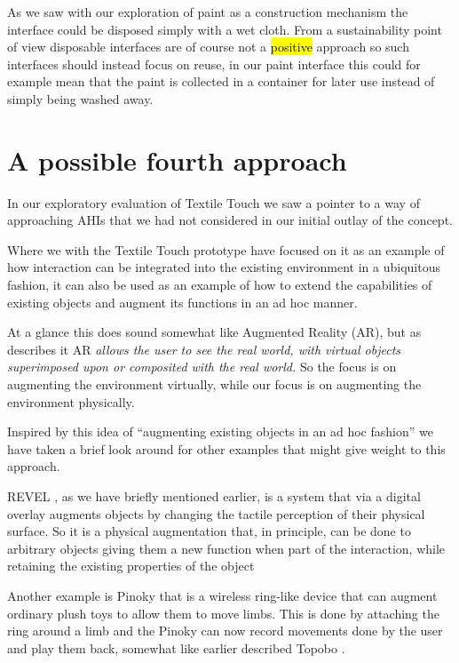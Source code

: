 As we saw with our exploration of paint as a construction mechanism the interface could be disposed simply with a wet cloth.
From a sustainability point of view disposable interfaces are of course not a \hl{positive} approach so such interfaces should instead focus on reuse, in our paint interface this could for example mean that the paint is collected in a container for later use instead of simply being washed away. 

\section{A possible fourth approach}
In our exploratory evaluation of Textile Touch we saw a pointer to a way of approaching AHIs that we had not considered in our initial outlay of the concept.


Where we with the Textile Touch prototype have focused on it as an example of how interaction can be integrated into the existing environment in a ubiquitous fashion, it can also be used as an example of how to extend the capabilities of existing objects and augment its functions in an ad hoc manner.

At a glance this does sound somewhat like Augmented Reality (AR), but as \citet{azuma1997survey} describes it AR \emph{allows the user to see the real world, with virtual objects superimposed upon or composited with the real world.}
So the focus is on augmenting the environment virtually, while our focus is on augmenting the environment physically.


Inspired by this idea of ``augmenting existing objects in an ad hoc fashion'' we have taken a brief look around for other examples that might give weight to this approach.

REVEL \citep{bau2013revel}, as we have briefly mentioned earlier, is a system that via a digital overlay augments objects by changing the tactile perception of their physical surface.
So it is a physical augmentation that, in principle, can be done to arbitrary objects giving them a new function when part of the interaction, while retaining the existing properties of the object 

Another example is Pinoky \citep{sugiura2012pinoky} that is a wireless ring-like device that can augment ordinary plush toys to allow them to move limbs.
This is done by attaching the ring around a limb and the Pinoky can now record movements done by the user and play them back, somewhat like earlier described Topobo \citep{raffle2004topobo}.

